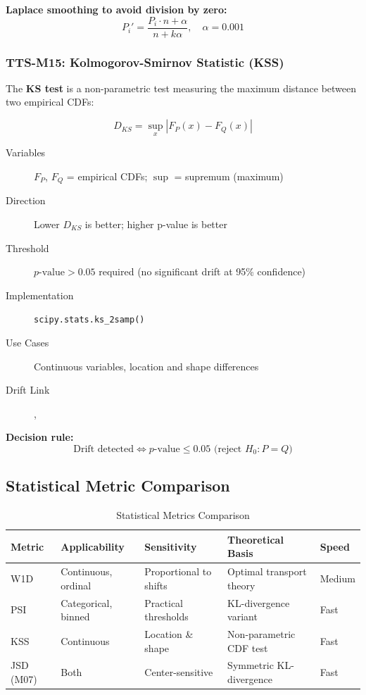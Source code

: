 \textbf{Laplace smoothing to avoid division by zero:}
\begin{equation}
P_i' = \frac{P_i \cdot n + \alpha}{n + k\alpha}, \quad \alpha = 0.001
\end{equation}

\subsubsection{TTS-M15: Kolmogorov-Smirnov Statistic (KSS)}

The \textbf{KS test} is a non-parametric test measuring the maximum distance
between two empirical CDFs:

\begin{equation}
\boxed{
D_{KS} = \sup_x |F_P(x) - F_Q(x)|
}
\end{equation}

\begin{description}
  \item[Variables] $F_P$, $F_Q$ = empirical CDFs; $\sup$ = supremum (maximum)
  \item[Direction] Lower $D_{KS}$ is better; higher p-value is better
  \item[Threshold] $p\text{-value} > 0.05$ required (no significant drift at 95\% confidence)
  \item[Implementation] \texttt{scipy.stats.ks\_2samp()}
  \item[Use Cases] Continuous variables, location and shape differences
  \item[Drift Link] , 
\end{description}

\textbf{Decision rule:}
\begin{equation}
\text{Drift detected} \iff p\text{-value} \leq 0.05 \text{ (reject } H_0: P = Q\text{)}
\end{equation}

\subsection{Statistical Metric Comparison}

\begin{table}[htbp]
\centering
\footnotesize
\caption{Statistical Metrics Comparison}
\label{tab:stat-metrics-comparison}
\begin{tabularx}{\textwidth}{@{}l l l X l@{}}
\toprule
\textbf{Metric} & \textbf{Applicability} & \textbf{Sensitivity} & \textbf{Theoretical Basis} & \textbf{Speed} \\
\midrule
W1D & Continuous, ordinal & Proportional to shifts & Optimal transport theory & Medium \\
PSI & Categorical, binned & Practical thresholds & KL-divergence variant & Fast \\
KSS & Continuous & Location \& shape & Non-parametric CDF test & Fast \\
JSD (M07) & Both & Center-sensitive & Symmetric KL-divergence & Fast \\
\bottomrule
\end{tabularx}
\end{table}

